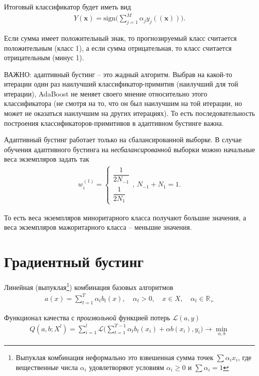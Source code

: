\documentclass[%
	11pt,
	a4paper,
	utf8,
		]{article}
\begin{document}
Итоговый классификатор будет иметь вид
\begin{align*}
	Y(\mathbf{x}) = \text{sign} \Big( \sum_{j=1}^{M} \alpha_j y_j(\mathbf{(x)}) \Big).
\end{align*}

Если сумма имеет положительный знак, то прогнозируемый класс считается положительным (класс 1), а если сумма отрицательная, то класс считается отрицательным (минус 1).

ВАЖНО: адаптивный бустинг -- это жадный алгоритм. Выбрав на какой-то итерации один раз наилучший классификатор-примитив (наилучший для той итерации), AdaBoost не меняет своего мнение относительно этого классификатора (не смотря на то, что он был наилучшим на той итерации, но может не оказаться наилучшим на других итерациях). То есть последовательность построения классификаторов-примитивов в адаптивном бустинге важна.

Адаптивный бустинг работает только на сбалансированной выборке. В случае обучения адаптивного бустинга на \emph{несбалансированной} выборки можно начальные веса экземпляров задать так
\begin{align*}
	w_i^{(1)} = 
	\begin{cases}
		\dfrac{1}{2 N_{-1}}\\
		\dfrac{1}{ 2 N_{1}}
	\end{cases},\ N_{-1} + N_1 = 1.
\end{align*}

То есть веса экземпляров миноритарного класса получают большие значения, а веса экземпляров мажоритарного класса -- меньшие значения.


\section{Градиентный бустинг}

Линейная (выпуклая\footnote{Выпуклая комбинация неформально это взвешенная сумма точек $ \sum \alpha_i x_i $, где вещественные числа $ \alpha_i $ удовлетворяют условиям $ \alpha_i \geqslant 0 $ и $ \sum \alpha_i = 1 $}) комбинация базовых алгоритмов
\begin{align*}
	a(x) = \sum_{t = 1}^{T} \alpha_t b_t(x), \quad \alpha_t > 0, \quad x \in X, \quad \alpha_t \in \mathbb{R}_{+}
\end{align*}

Функционал качества с \emph{произвольной} функцией потерь $ \mathcal{L}(a, y) $
\begin{align*}
	Q(a, b; X^l) = \sum_{i=1}^{l} \mathcal{L}\Big( \sum_{t=1}^{T-1} \alpha_t b_t(x_i) + \alpha b(x_i), y_i\Big) \to \underset{\alpha, b}{\min}
\end{align*}
\end{document}
